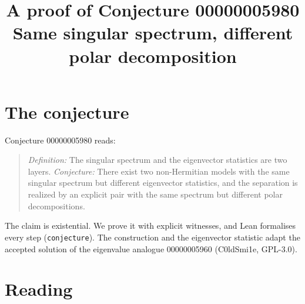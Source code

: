 \documentclass[11pt]{article}
\title{A proof of Conjecture 00000005980\\[2pt]
\large Same singular spectrum, different polar decomposition}
\date{}
\theoremstyle{definition}
\theoremstyle{remark}
\renewcommand{\_}{\oldus\allowbreak}
\begin{document}
\sloppy
\maketitle

\section{The conjecture}

Conjecture 00000005980 reads:

\begin{quote}
\emph{Definition:} The singular spectrum and the eigenvector statistics are two layers.
\emph{Conjecture:} There exist two non-Hermitian models with the same singular spectrum but different
eigenvector statistics, and the separation is realized by an explicit pair with the same spectrum but
different polar decompositions.
\end{quote}

The claim is existential. We prove it with explicit witnesses, and Lean formalises every step
(\texttt{conjecture\_5980}). The construction and the eigenvector statistic adapt the accepted solution of
the eigenvalue analogue 00000005960 (C0ldSmi1e, GPL-3.0).

\section{Reading}
\end{document}
